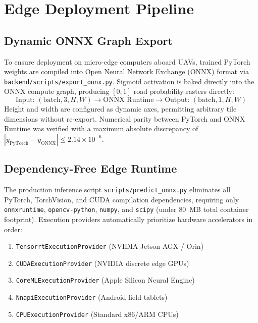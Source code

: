 \documentclass[conference]{IEEEtran}
\begin{document}
\section{Edge Deployment Pipeline}
\label{sec:edge}

\subsection{Dynamic ONNX Graph Export}
To ensure deployment on micro-edge computers aboard UAVs, trained PyTorch weights are compiled into Open Neural Network Exchange (ONNX) format via \texttt{backend/scripts/export\_onnx.py}. Sigmoid activation is baked directly into the ONNX compute graph, producing $[0, 1]$ road probability rasters directly:
\begin{equation}
    \text{Input: } (\text{batch}, 3, H, W) \longrightarrow \text{ONNX Runtime} \longrightarrow \text{Output: } (\text{batch}, 1, H, W)
\end{equation}
Height and width are configured as dynamic axes, permitting arbitrary tile dimensions without re-export. Numerical parity between PyTorch and ONNX Runtime was verified with a maximum absolute discrepancy of $|y_{\text{PyTorch}} - y_{\text{ONNX}}| \le 2.14 \times 10^{-6}$.

\subsection{Dependency-Free Edge Runtime}
The production inference script \texttt{scripts/predict\_onnx.py} eliminates all PyTorch, TorchVision, and CUDA compilation dependencies, requiring only \texttt{onnxruntime}, \texttt{opencv-python}, \texttt{numpy}, and \texttt{scipy} (under 80~MB total container footprint). Execution providers automatically prioritize hardware accelerators in order:
\begin{enumerate}
    \item \texttt{TensorrtExecutionProvider} (NVIDIA Jetson AGX / Orin)
    \item \texttt{CUDAExecutionProvider} (NVIDIA discrete edge GPUs)
    \item \texttt{CoreMLExecutionProvider} (Apple Silicon Neural Engine)
    \item \texttt{NnapiExecutionProvider} (Android field tablets)
    \item \texttt{CPUExecutionProvider} (Standard x86/ARM CPUs)
\end{enumerate}
\end{document}
